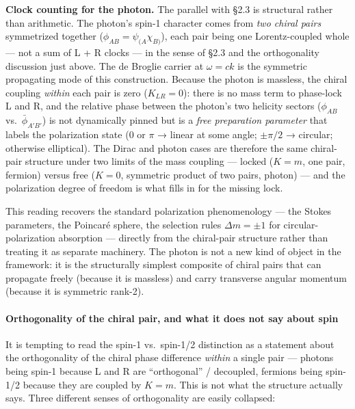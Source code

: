 \documentclass[
]{article}
\begin{document}
\textbf{Clock counting for the photon.} The parallel with §2.3 is
structural rather than arithmetic. The photon's spin-1 character comes
from \emph{two chiral pairs} symmetrized together
(\(\phi_{AB} = \psi_{(A}\chi_{B)}\)), each pair being one
Lorentz-coupled whole --- not a sum of L + R clocks --- in the sense of
§2.3 and the orthogonality discussion just above. The de Broglie carrier
at \(\omega = ck\) is the symmetric propagating mode of this
construction. Because the photon is massless, the chiral coupling
\emph{within} each pair is zero (\(K_{LR} = 0\)): there is no mass term
to phase-lock L and R, and the relative phase between the photon's two
helicity sectors (\(\phi_{AB}\) vs.~\(\bar\phi_{A'B'}\)) is not
dynamically pinned but is a \emph{free preparation parameter} that
labels the polarization state (0 or \(\pi\) → linear at some angle;
\(\pm\pi/2\) → circular; otherwise elliptical). The Dirac and photon
cases are therefore the same chiral-pair structure under two limits of
the mass coupling --- locked (\(K = m\), one pair, fermion) versus free
(\(K = 0\), symmetric product of two pairs, photon) --- and the
polarization degree of freedom is what fills in for the missing lock.

This reading recovers the standard polarization phenomenology --- the
Stokes parameters, the Poincaré sphere, the selection rules
\(\Delta m = \pm 1\) for circular-polarization absorption --- directly
from the chiral-pair structure rather than treating it as separate
machinery. The photon is not a new kind of object in the framework: it
is the structurally simplest composite of chiral pairs that can
propagate freely (because it is massless) and carry transverse angular
momentum (because it is symmetric rank-2).

\paragraph{Orthogonality of the chiral pair, and what it does not say
about
spin}\label{orthogonality-of-the-chiral-pair-and-what-it-does-not-say-about-spin}

It is tempting to read the spin-1 vs.~spin-1/2 distinction as a
statement about the orthogonality of the chiral phase difference
\emph{within} a single pair --- photons being spin-1 because L and R are
``orthogonal'' / decoupled, fermions being spin-1/2 because they are
coupled by \(K = m\). This is not what the structure actually says.
Three different senses of orthogonality are easily collapsed:
\end{document}
